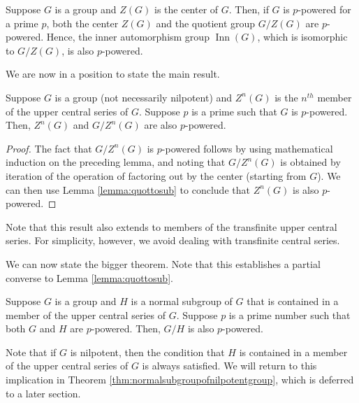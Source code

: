 \begin{lemma}\label{lemma:inn-aut-is-powering-invariant}
  Suppose $G$ is a group and $Z(G)$ is the center of $G$. Then, if $G$
  is $p$-powered for a prime $p$, both the center $Z(G)$ and the
  quotient group $G/Z(G)$ are $p$-powered. Hence, the inner
  automorphism group $\operatorname{Inn}(G)$, which is isomorphic to
  $G/Z(G)$, is also $p$-powered.
\end{lemma}

We are now in a position to state the main result.

\begin{theorem}\label{thm:ucsqpi}
  Suppose $G$ is a group (not necessarily nilpotent) and $Z^n(G)$ is
  the $n^{th}$ member of the upper central series of $G$. Suppose $p$
  is a prime such that $G$ is $p$-powered. Then, $Z^n(G)$ and
  $G/Z^n(G)$ are also $p$-powered.
\end{theorem}

\begin{proof}
  The fact that $G/Z^n(G)$ is $p$-powered follows by using
  mathematical induction on the preceding lemma, and noting that
  $G/Z^n(G)$ is obtained by iteration of the operation of factoring out by
  the center (starting from $G$). We can then use Lemma
  \ref{lemma:quottosub} to conclude that $Z^n(G)$ is also $p$-powered.
\end{proof}

Note that this result also extends to members of the transfinite upper
central series. For simplicity, however, we avoid dealing with
transfinite central series.

We can now state the bigger theorem. Note that this establishes a
partial converse to Lemma \ref{lemma:quottosub}.

\begin{theorem}\label{thm:normalinucspiequalsqpi}
  Suppose $G$ is a group and $H$ is a normal subgroup of $G$ that is
  contained in a member of the upper central series of $G$. Suppose
  $p$ is a prime number such that both $G$ and $H$ are
  $p$-powered. Then, $G/H$ is also $p$-powered.
\end{theorem}

Note that if $G$ is nilpotent, then the condition that $H$ is
contained in a member of the upper central series of $G$ is always
satisfied. We will return to this implication in Theorem
\ref{thm:normalsubgroupofnilpotentgroup}, which is deferred to a later
section.

